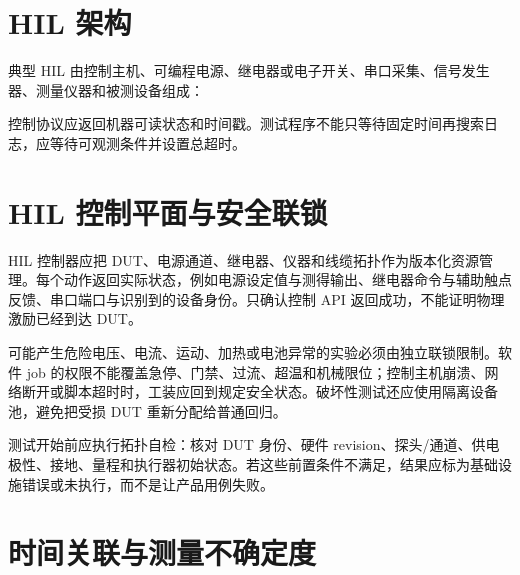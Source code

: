 \section{HIL 架构}

典型 HIL 由控制主机、可编程电源、继电器或电子开关、串口采集、信号发生器、测量仪器和被测设备组成：

\begin{center}
\end{center}

控制协议应返回机器可读状态和时间戳。测试程序不能只等待固定时间再搜索日志，应等待可观测条件并设置总超时。

\section{HIL 控制平面与安全联锁}

HIL 控制器应把 DUT、电源通道、继电器、仪器和线缆拓扑作为版本化资源管理。每个动作返回实际状态，例如电源设定值与测得输出、继电器命令与辅助触点反馈、串口端口与识别到的设备身份。只确认控制 API 返回成功，不能证明物理激励已经到达 DUT。

可能产生危险电压、电流、运动、加热或电池异常的实验必须由独立联锁限制。软件 job 的权限不能覆盖急停、门禁、过流、超温和机械限位；控制主机崩溃、网络断开或脚本超时时，工装应回到规定安全状态。破坏性测试还应使用隔离设备池，避免把受损 DUT 重新分配给普通回归。

测试开始前应执行拓扑自检：核对 DUT 身份、硬件 revision、探头/通道、供电极性、接地、量程和执行器初始状态。若这些前置条件不满足，结果应标为基础设施错误或未执行，而不是让产品用例失败。

\section{时间关联与测量不确定度}

